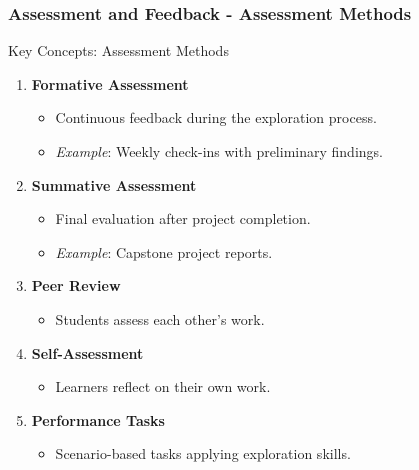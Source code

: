 \documentclass[aspectratio=169]{beamer}
\begin{document}
\begin{frame}[fragile]
    \frametitle{Assessment and Feedback - Assessment Methods}
    \begin{block}{Key Concepts: Assessment Methods}
        \begin{enumerate}
            \item \textbf{Formative Assessment}
            \begin{itemize}
                \item Continuous feedback during the exploration process.
                \item \textit{Example}: Weekly check-ins with preliminary findings.
            \end{itemize}
            
            \item \textbf{Summative Assessment}
            \begin{itemize}
                \item Final evaluation after project completion.
                \item \textit{Example}: Capstone project reports.
            \end{itemize}
            
            \item \textbf{Peer Review}
            \begin{itemize}
                \item Students assess each other's work.
            \end{itemize}
            
            \item \textbf{Self-Assessment}
            \begin{itemize}
                \item Learners reflect on their own work.
            \end{itemize}
            
            \item \textbf{Performance Tasks}
            \begin{itemize}
                \item Scenario-based tasks applying exploration skills.
            \end{itemize}
        \end{enumerate}
    \end{block}
\end{frame}
\end{document}
